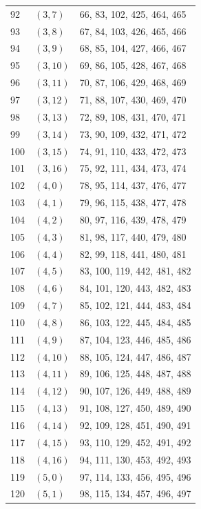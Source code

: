 \documentclass{article}
\begin{document}
\begin{longtable}{lll}
  92 & \((3, 7)\) & 66, 83, 102, 425, 464, 465 \\
  93 & \((3, 8)\) & 67, 84, 103, 426, 465, 466 \\
  94 & \((3, 9)\) & 68, 85, 104, 427, 466, 467 \\
  95 & \((3, 10)\) & 69, 86, 105, 428, 467, 468 \\
  96 & \((3, 11)\) & 70, 87, 106, 429, 468, 469 \\
  97 & \((3, 12)\) & 71, 88, 107, 430, 469, 470 \\
  98 & \((3, 13)\) & 72, 89, 108, 431, 470, 471 \\
  99 & \((3, 14)\) & 73, 90, 109, 432, 471, 472 \\
  100 & \((3, 15)\) & 74, 91, 110, 433, 472, 473 \\
  101 & \((3, 16)\) & 75, 92, 111, 434, 473, 474 \\
  102 & \((4, 0)\) & 78, 95, 114, 437, 476, 477 \\
  103 & \((4, 1)\) & 79, 96, 115, 438, 477, 478 \\
  104 & \((4, 2)\) & 80, 97, 116, 439, 478, 479 \\
  105 & \((4, 3)\) & 81, 98, 117, 440, 479, 480 \\
  106 & \((4, 4)\) & 82, 99, 118, 441, 480, 481 \\
  107 & \((4, 5)\) & 83, 100, 119, 442, 481, 482 \\
  108 & \((4, 6)\) & 84, 101, 120, 443, 482, 483 \\
  109 & \((4, 7)\) & 85, 102, 121, 444, 483, 484 \\
  110 & \((4, 8)\) & 86, 103, 122, 445, 484, 485 \\
  111 & \((4, 9)\) & 87, 104, 123, 446, 485, 486 \\
  112 & \((4, 10)\) & 88, 105, 124, 447, 486, 487 \\
  113 & \((4, 11)\) & 89, 106, 125, 448, 487, 488 \\
  114 & \((4, 12)\) & 90, 107, 126, 449, 488, 489 \\
  115 & \((4, 13)\) & 91, 108, 127, 450, 489, 490 \\
  116 & \((4, 14)\) & 92, 109, 128, 451, 490, 491 \\
  117 & \((4, 15)\) & 93, 110, 129, 452, 491, 492 \\
  118 & \((4, 16)\) & 94, 111, 130, 453, 492, 493 \\
  119 & \((5, 0)\) & 97, 114, 133, 456, 495, 496 \\
  120 & \((5, 1)\) & 98, 115, 134, 457, 496, 497 \\

\end{longtable}
\end{document}

